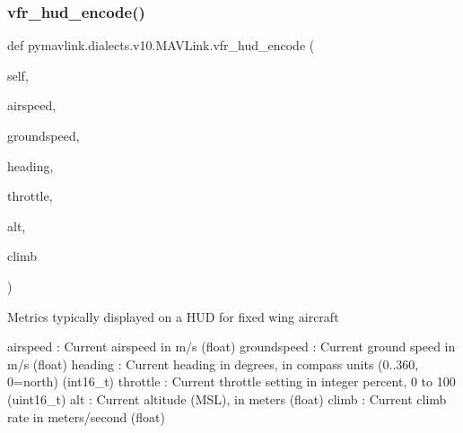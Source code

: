 \begin{DoxyVerb}
\begin{DoxyVerb}
\begin{DoxyVerb}
\begin{DoxyVerb}
\begin{DoxyVerb}
\begin{DoxyVerb}
\begin{DoxyVerb}
\begin{DoxyVerb}
\begin{DoxyVerb}
\begin{DoxyVerb}
\subsubsection{\texorpdfstring{vfr\+\_\+hud\+\_\+encode()}{vfr\_hud\_encode()}}
{\footnotesize\ttfamily def pymavlink.\+dialects.\+v10.\+M\+A\+V\+Link.\+vfr\+\_\+hud\+\_\+encode (\begin{DoxyParamCaption}\item[{}]{self,  }\item[{}]{airspeed,  }\item[{}]{groundspeed,  }\item[{}]{heading,  }\item[{}]{throttle,  }\item[{}]{alt,  }\item[{}]{climb }\end{DoxyParamCaption})}

\begin{DoxyVerb}Metrics typically displayed on a HUD for fixed wing aircraft

airspeed                  : Current airspeed in m/s (float)
groundspeed               : Current ground speed in m/s (float)
heading                   : Current heading in degrees, in compass units (0..360, 0=north) (int16_t)
throttle                  : Current throttle setting in integer percent, 0 to 100 (uint16_t)
alt                       : Current altitude (MSL), in meters (float)
climb                     : Current climb rate in meters/second (float)\end{DoxyVerb}
 \mbox{\label{classpymavlink_1_1dialects_1_1v10_1_1MAVLink_a08a1e99dfe399723aed33f35767feaa7}} 

\end{DoxyVerb}
\end{DoxyVerb}
\end{DoxyVerb}
\end{DoxyVerb}
\end{DoxyVerb}
\end{DoxyVerb}
\end{DoxyVerb}
\end{DoxyVerb}
\end{DoxyVerb}
\end{DoxyVerb}
